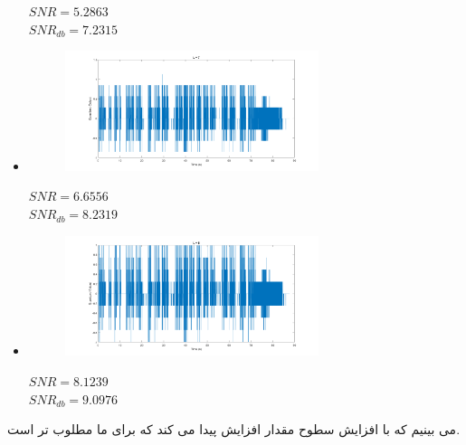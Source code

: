 \documentclass[a4paper]{article}
\begin{document}
\begin{itemize}
\begin{figure}[H]
		\centering
	\end{figure}
	\begin{flushleft}
		$SNR = 5.2863$\\
		$SNR_{db} = 7.2315$
	\end{flushleft}
	\item 
	\begin{figure}[H]
		\includegraphics[width=0.7\textwidth]{comsys_fig68.png}\\ 
		\centering
	\end{figure}
	\begin{flushleft}
		$SNR = 6.6556$\\
		$SNR_{db} = 8.2319$
	\end{flushleft}
	\item 
	\begin{figure}[H]
		\includegraphics[width=0.7\textwidth]{comsys_fig69.png}\\ 
		\centering
	\end{figure}
	\begin{flushleft}
		$SNR = 8.1239$\\
		$SNR_{db} = 9.0976$
	\end{flushleft}
\end{itemize}
می بینیم که با افزایش سطوح مقدار  افزایش پیدا می کند که برای ما مطلوب تر است.
\subsection{}
\end{document}
